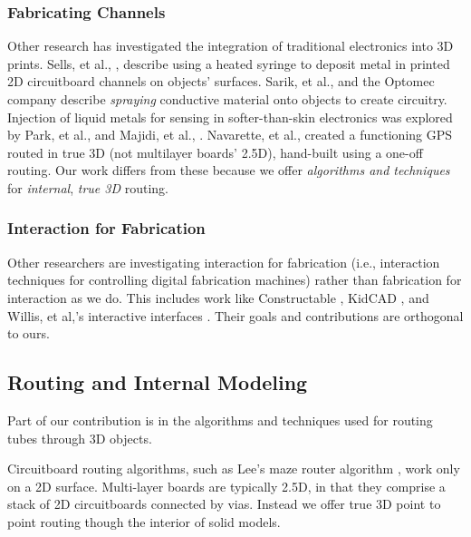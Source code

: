 \subsubsection{Fabricating Channels}

Other research has investigated the integration of traditional electronics into 3D prints.  Sells, et al., \cite{Sells-reprap}, describe using a heated syringe to deposit metal in printed 2D circuitboard channels on objects' surfaces.  Sarik, et al., \cite{Sarik-tracebrush} and the Optomec company \cite{optomec} describe \emph{spraying} conductive material onto objects to create circuitry.  Injection of liquid metals for sensing in softer-than-skin electronics was explored by Park, et al., \cite{Park-microchannels} and Majidi, et al., \cite{Majidi-curvature}.  Navarette, et al., created a functioning GPS routed in true 3D (not multilayer boards' 2.5D), hand-built using a one-off routing.  Our work differs from these because we offer \emph{algorithms and techniques} for \emph{internal}, \emph{true 3D} routing.   

\subsubsection{Interaction for Fabrication}

Other researchers are investigating interaction for fabrication (i.e., interaction techniques for controlling digital fabrication machines) rather than fabrication for interaction as we do.  This includes work like Constructable \cite{Mueller-constructable}, KidCAD \cite{Follmer-kidcad}, and Willis, et al,'s interactive interfaces \cite{Willis-interactive}. Their goals and contributions are orthogonal to ours.

\subsection{Routing and Internal Modeling}

Part of our contribution is in the algorithms and techniques used for routing tubes through 3D objects.

Circuitboard routing algorithms, such as Lee's maze router algorithm \cite{Lee-maze}, work only on a 2D surface. Multi-layer boards are typically 2.5D, in that they comprise a stack of 2D circuitboards connected by vias.  Instead we offer true 3D point to point routing though the interior of solid models.


